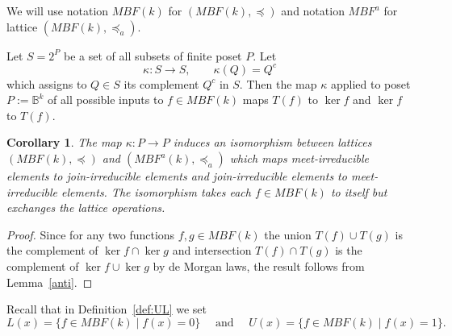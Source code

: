 \documentclass[10pt,letterpaper]{article}
\newcommand{\bbB}{\mathbb{B}}
\newtheorem{cor}[thm]{Corollary}
\begin{document}
We will use notation $MBF(k)$ for $(MBF(k), \preceq)$ and notation $MBF^a$ for lattice $(MBF(k), \preceq_a)$.

 Let $S=2^P$ be a set of all subsets of finite poset $P$. 
Let 
\begin{equation}\label{kappa}
\kappa: S\to S,\qquad \kappa(Q) = Q^c 
\end{equation}
which assigns to $Q\in S$ its complement $Q^c$ in $S$. 
Then the map $\kappa$ applied to poset $P:=\bbB^k$ of all possible inputs to $f \in MBF(k)$ maps $T(f)$ to $\ker f$ and $\ker f $ to $T(f)$.



\begin{cor}\label{cor}
The map $\kappa:P \to P$ induces an isomorphism between lattices $(MBF(k),
\preceq)$ and $ (MBF^a(k), \preceq_a)$ which maps meet-irreducible elements to join-irreducible elements and join-irreducible elements to meet-irreducible elements. The isomorphism takes each $f \in MBF(k)$ to itself but exchanges the lattice operations.
\end{cor}
\begin{proof}
Since for any two functions $f,g\in MBF(k)$ the union 
$T(f) \cup T(g)$ is the complement of $\ker f\cap \ker g $ and intersection
$T(f) \cap T(g)$ is the complement of $\ker f\cup \ker g $ by de Morgan laws, the result follows from Lemma~\ref{anti}.
\end{proof}

Recall that in Definition~\ref{def:UL} we set 
\[ L(x) = \{f \in MBF(k) \;|\; f(x) = 0\}
\quad \mbox{ and } \quad U(x) = \{f \in MBF(k) \;|\; f(x) = 1\}.\]
\end{document}
